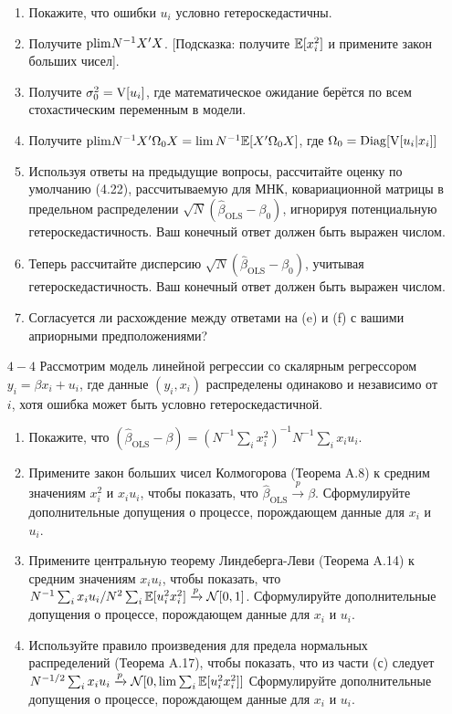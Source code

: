 \begin{small}
\begin{enumerate}
\begin{enumerate}
\item Покажите, что ошибки $u_i$ условно гетероскедастичны.
\item Получите $\mathrm{plim } N^{-1}X'X$. [Подсказка: получите $\mathbb{E}[x_i^2]$ и примените закон больших чисел].
\item Получите $\sigma_0^2 = \mathrm{V}[u_i]$, где математическое ожидание берётся по всем стохастическим переменным в модели.
\item Получите $\mathrm{plim } N^{-1}X'\Omega_0 X = \lim N^{-1}\mathbb{E}[X'\Omega_0 X]$, где $\Omega_0 = \mathrm{Diag}[\mathrm{V}[u_i|x_i]]$
\item Используя ответы на предыдущие вопросы, рассчитайте оценку по умолчанию (4.22), рассчитываемую для МНК, ковариационной матрицы в предельном распределении $\sqrt{N}(\hat{\beta}_{\text{OLS}}-\beta_0)$, игнорируя потенциальную гетероскедастичность. Ваш конечный ответ должен быть выражен числом. 
\item Теперь рассчитайте дисперсию  $\sqrt{N}(\hat{\beta}_{\text{OLS}}-\beta_0)$, учитывая гетероскедастичность. Ваш конечный ответ должен быть выражен числом.
\item Согласуется ли расхождение между ответами на (e) и (f) с вашими априорными предположениями?
\end{enumerate}
\item [$4-4$] Рассмотрим модель линейной регрессии со скалярным регрессором $y_i=\beta x_i +u_i$, где данные $(y_i, x_i)$ распределены одинаково и независимо от $i$, хотя ошибка может быть условно гетероскедастичной.
\begin{enumerate}
\item Покажите, что $(\hat{\beta}_{\text{OLS}}-\beta) = (N^{-1}\sum_i x_i^2)^{-1}N^{-1}\sum_i x_i u_i$.
\item Примените закон больших чисел Колмогорова (Теорема A.8) к средним значениям $x_i^2$ и $x_i u_i$, чтобы показать, что $\hat{\beta}_{\text{OLS}} \xrightarrow{p} \beta$. Сформулируйте дополнительные допущения о процессе, порождающем данные для $x_i$ и $u_i$.
\item Примените центральную теорему Линдеберга-Леви (Теорема A.14) к средним значениям $x_i u_i$, чтобы показать, что $N^{-1}\sum_i x_i u_i /N^2 \sum_i \mathbb{E} [u_i^2 x_i^2] \xrightarrow{p} \mathcal{N}[0,1]$. Сформулируйте дополнительные допущения о процессе, порождающем данные для $x_i$ и $u_i$.
\item Используйте правило произведения для предела нормальных распределений (Теорема A.17), чтобы показать, что из части (с) следует $N^{-1/2}\sum_i x_i u_i \xrightarrow{p} \mathcal{N}[0,\lim  \sum_i \mathbb{E} [u_i^2 x_i^2]]$ Сформулируйте дополнительные допущения о процессе, порождающем данные для $x_i$ и $u_i$.

\end{enumerate}
\end{enumerate}
\end{small}
